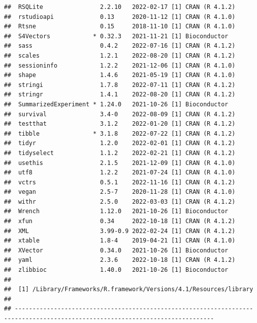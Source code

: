 \documentclass[
]{book}
\begin{document}
\begin{verbatim}
##  RSQLite                2.2.10   2022-02-17 [1] CRAN (R 4.1.2)
##  rstudioapi             0.13     2020-11-12 [1] CRAN (R 4.1.0)
##  Rtsne                  0.15     2018-11-10 [1] CRAN (R 4.1.0)
##  S4Vectors            * 0.32.3   2021-11-21 [1] Bioconductor
##  sass                   0.4.2    2022-07-16 [1] CRAN (R 4.1.2)
##  scales                 1.2.1    2022-08-20 [1] CRAN (R 4.1.2)
##  sessioninfo            1.2.2    2021-12-06 [1] CRAN (R 4.1.0)
##  shape                  1.4.6    2021-05-19 [1] CRAN (R 4.1.0)
##  stringi                1.7.8    2022-07-11 [1] CRAN (R 4.1.2)
##  stringr                1.4.1    2022-08-20 [1] CRAN (R 4.1.2)
##  SummarizedExperiment * 1.24.0   2021-10-26 [1] Bioconductor
##  survival               3.4-0    2022-08-09 [1] CRAN (R 4.1.2)
##  testthat               3.1.2    2022-01-20 [1] CRAN (R 4.1.2)
##  tibble               * 3.1.8    2022-07-22 [1] CRAN (R 4.1.2)
##  tidyr                  1.2.0    2022-02-01 [1] CRAN (R 4.1.2)
##  tidyselect             1.1.2    2022-02-21 [1] CRAN (R 4.1.2)
##  usethis                2.1.5    2021-12-09 [1] CRAN (R 4.1.0)
##  utf8                   1.2.2    2021-07-24 [1] CRAN (R 4.1.0)
##  vctrs                  0.5.1    2022-11-16 [1] CRAN (R 4.1.2)
##  vegan                  2.5-7    2020-11-28 [1] CRAN (R 4.1.0)
##  withr                  2.5.0    2022-03-03 [1] CRAN (R 4.1.2)
##  Wrench                 1.12.0   2021-10-26 [1] Bioconductor
##  xfun                   0.34     2022-10-18 [1] CRAN (R 4.1.2)
##  XML                    3.99-0.9 2022-02-24 [1] CRAN (R 4.1.2)
##  xtable                 1.8-4    2019-04-21 [1] CRAN (R 4.1.0)
##  XVector                0.34.0   2021-10-26 [1] Bioconductor
##  yaml                   2.3.6    2022-10-18 [1] CRAN (R 4.1.2)
##  zlibbioc               1.40.0   2021-10-26 [1] Bioconductor
## 
##  [1] /Library/Frameworks/R.framework/Versions/4.1/Resources/library
## 
## ------------------------------------------------------------------------------------------------------------------------------
\end{verbatim}

  
\end{document}
